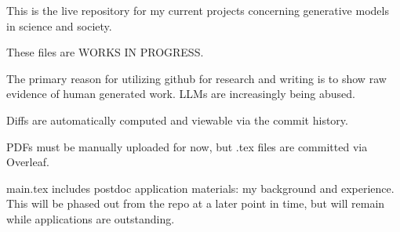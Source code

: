 This is the live repository for my current projects concerning generative models in science and society.  

These files are WORKS IN PROGRESS.

The primary reason for utilizing github for research and writing is to show raw evidence of human generated work.  LLMs are increasingly being abused.

Diffs are automatically computed and viewable via the commit history.

PDFs must be manually uploaded for now, but .tex files are committed via Overleaf.

main.tex includes postdoc application materials: my background and experience.  This will be phased out from the repo at a later point in time, but will remain while applications are outstanding.
